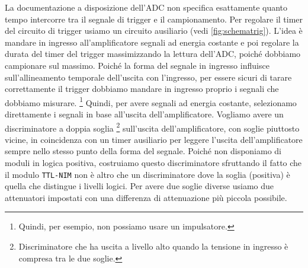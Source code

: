 La documentazione a disposizione dell'ADC non specifica esattamente
quanto tempo intercorre tra il segnale di trigger e il campionamento.
Per regolare il timer del circuito di trigger usiamo un circuito ausiliario
(vedi \autoref{fig:schematrig}).
L'idea è mandare in ingresso all'amplificatore segnali ad energia costante
e poi regolare la durata del timer del trigger massimizzando la lettura dell'ADC,
poiché dobbiamo campionare sul massimo.
Poiché la forma del segnale in ingresso influisce sull'allineamento temporale
dell'uscita con l'ingresso,
per essere sicuri di tarare correttamente il trigger
dobbiamo mandare in ingresso proprio i segnali che dobbiamo misurare.%
\footnote{Quindi, per esempio, non possiamo usare un impulsatore.}
Quindi, per avere segnali ad energia costante,
selezionamo direttamente i segnali in base all'uscita dell'amplificatore.
Vogliamo avere un discriminatore a doppia soglia%
\footnote{Discriminatore che ha uscita a livello alto quando la tensione in ingresso è compresa tra le due soglie.}
sull'uscita dell'amplificatore, con soglie piuttosto vicine,
in coincidenza con un timer ausiliario per leggere l'uscita dell'amplificatore
sempre nello stesso punto della forma del segnale.
Poiché non disponiamo di moduli in logica positiva,
costruiamo questo discriminatore sfruttando il fatto che il modulo \texttt{TTL-NIM}
non è altro che un discriminatore dove la soglia (positiva) è quella che distingue i livelli logici.
Per avere due soglie diverse
usiamo due attenuatori impostati con una differenza di attenuazione più piccola possibile.
